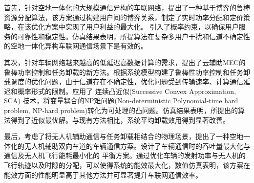 首先，针对空地一体化的大规模通信异构的车联网络，提出了一种基于博弈的鲁棒资源分配算法，该方案通过构建用户间的博弈关系，制定了实时功率分配和定价策略，在该优化方案中实现了用户利益的最大化。
引入了概率约束，以确保用户服务的可靠性和稳定性。仿真结果表明，所提算法在复杂多用户干扰和信道不确定性的空地一体化异构车联网通信场景下是有效的。

其次，针对车辆网络越来越高的低延迟高数据计算的需求，提出了云辅助MEC的鲁棒功率控制和任务卸载的新方法。根据系统模型构建了鲁棒性功率控制和任务卸载调度的优化问题，由于信道存在不确定性，优化问题受到传输速率、计算通信延迟和概率形式的限制。应用了 连续凸近似(Successive Convex Approximation, SCA) 技术，将变量耦合的NP难问题(Non-deterministic Polynomial-time hard problem, NP-hard problem)转化为可处理的凸问题。仿真结果表明，所提出的算法得到了近似最优解。与现有方法相比，系统平均卸载效用得到显著改善。

最后，考虑了将无人机辅助通信与任务卸载相结合的物理场景，提出了一种空地一体化的无人机辅助双向车道的车辆通信方案。设计了车辆通信时的吞吐量最大化与通信及无人机飞行能耗最小化的
平衡方案。通过优化车辆的发射功率与无人机的飞行轨迹以及时隙的分配，可以使得系统的能效最大化，数值仿真表明，该方案在能效方面的性能明显高于其他方法并可显著提升车联网通信效率。

\begin{keywords}
\mykeywords
\end{keywords}

\makeatletter
{}  \CAST@value@classification   %
\makeatother

\newpage\ \vspace{-2.5em}
\vspace{0.23cm}   %
\begin{center}
\makeatletter
{}\textbf{\timesfont{\CAST@value@entitle}}    %
\makeatother
\end{center}

